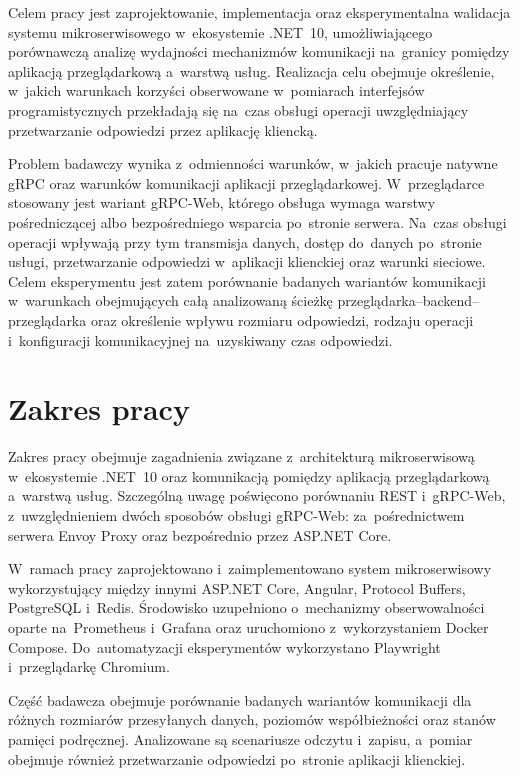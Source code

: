 Celem pracy jest zaprojektowanie, implementacja oraz eksperymentalna walidacja systemu mikroserwisowego w~ekosystemie .NET~10, umożliwiającego porównawczą analizę wydajności mechanizmów komunikacji na~granicy pomiędzy aplikacją przeglądarkową a~warstwą usług. Realizacja celu obejmuje określenie, w~jakich warunkach korzyści obserwowane w~pomiarach interfejsów programistycznych przekładają się na~czas obsługi operacji uwzględniający przetwarzanie odpowiedzi przez aplikację kliencką.

Problem badawczy wynika z~odmienności warunków, w~jakich pracuje natywne gRPC oraz warunków komunikacji aplikacji przeglądarkowej. W~przeglądarce stosowany jest wariant gRPC-Web, którego obsługa wymaga warstwy pośredniczącej albo bezpośredniego wsparcia po~stronie serwera. Na~czas obsługi operacji wpływają przy tym transmisja danych, dostęp do~danych po~stronie usługi, przetwarzanie odpowiedzi w~aplikacji klienckiej oraz warunki sieciowe. Celem eksperymentu jest zatem porównanie badanych wariantów komunikacji w~warunkach obejmujących całą analizowaną ścieżkę przeglądarka--backend--przeglądarka oraz określenie wpływu rozmiaru odpowiedzi, rodzaju operacji i~konfiguracji komunikacyjnej na~uzyskiwany czas odpowiedzi.

\section{Zakres pracy}
\label{sec:ZakresPracy}

Zakres pracy obejmuje zagadnienia związane z~architekturą mikroserwisową
w~ekosystemie .NET~10 oraz komunikacją pomiędzy aplikacją przeglądarkową
a~warstwą usług. Szczególną uwagę poświęcono porównaniu REST i~gRPC-Web,
z~uwzględnieniem dwóch sposobów obsługi gRPC-Web: za~pośrednictwem serwera
Envoy Proxy oraz bezpośrednio przez ASP.NET Core.

W~ramach pracy zaprojektowano i~zaimplementowano system mikroserwisowy
wykorzystujący między innymi ASP.NET Core, Angular, Protocol Buffers,
PostgreSQL i~Redis. Środowisko uzupełniono o~mechanizmy obserwowalności
oparte na~Prometheus i~Grafana oraz uruchomiono z~wykorzystaniem Docker
Compose. Do~automatyzacji eksperymentów wykorzystano Playwright
i~przeglądarkę Chromium.

Część badawcza obejmuje porównanie badanych wariantów komunikacji dla
różnych rozmiarów przesyłanych danych, poziomów współbieżności oraz stanów
pamięci podręcznej. Analizowane są scenariusze odczytu i~zapisu, a~pomiar
obejmuje również przetwarzanie odpowiedzi po~stronie aplikacji klienckiej.

